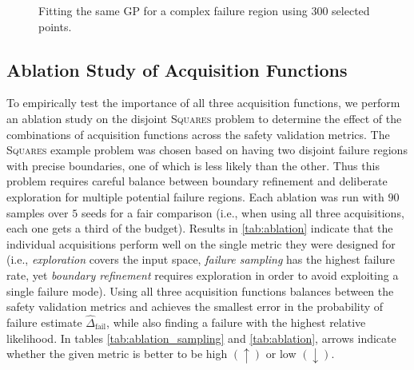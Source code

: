 \begin{figure}[t!]
    \centering
    
    \caption{Fitting the same GP for a complex failure region using $\num{300}$ selected points.}
    \label{fig:aircraft}
\end{figure}


\subsection{Ablation Study of Acquisition Functions}
To empirically test the importance of all three acquisition functions, we perform an ablation study on the disjoint \textsc{Squares} problem to determine the effect of the combinations of acquisition functions across the safety validation metrics.
The \textsc{Squares} example problem was chosen based on having two disjoint failure regions with precise boundaries, one of which is less likely than the other.
Thus this problem requires careful balance between boundary refinement and deliberate exploration for multiple potential failure regions.
Each ablation was run with $90$ samples over $5$ seeds for a fair comparison (i.e., when using all three acquisitions, each one gets a third of the budget).
Results in \cref{tab:ablation} indicate that the individual acquisitions perform well on the single metric they were designed for (i.e., \textit{exploration} covers the input space, \textit{failure sampling} has the highest failure rate, yet \textit{boundary refinement} requires exploration in order to avoid exploiting a single failure mode). 
Using all three acquisition functions balances between the safety validation metrics and achieves the smallest error in the probability of failure estimate $\hat{\Delta}_\text{fail}$, while also finding a failure with the highest relative likelihood.
In tables \ref{tab:ablation_sampling} and \ref{tab:ablation}, arrows indicate whether the given metric is better to be high $(\uparrow)$ or low $(\downarrow)$.


